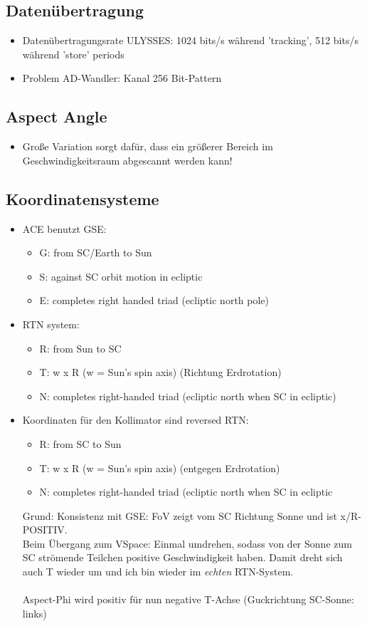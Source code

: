 \documentclass[]{article}
\begin{document}
	\subsection{Datenübertragung}
		\begin{itemize}
			\item Datenübertragungsrate ULYSSES: 1024 bits/s während 'tracking', 512 bits/s während 'store' periods
			\item Problem AD-Wandler: Kanal 256 Bit-Pattern 
		\end{itemize}
	\subsection{Aspect Angle}
	\begin{itemize}
		\item Große Variation sorgt dafür, dass ein größerer Bereich im Geschwindigkeitsraum abgescannt werden kann!
	\end{itemize}
	\subsection{Koordinatensysteme}
	\begin{itemize}
	\item ACE benutzt GSE: 
		\begin{itemize}
			\item G: from SC/Earth to Sun
			\item S: against SC orbit motion in ecliptic
			\item E: completes right handed triad (ecliptic north pole)
		\end{itemize}
	\item RTN system:
		\begin{itemize}
			\item R: from Sun to SC
			\item T: w x R (w = Sun's spin axis) (Richtung Erdrotation)
			\item N: completes right-handed triad (ecliptic north when SC in ecliptic)
		\end{itemize}
	\item Koordinaten für den Kollimator sind reversed RTN:
		\begin{itemize}
			\item R: from SC to Sun
			\item T: w x R (w = Sun's spin axis) (entgegen Erdrotation)
			\item N: completes right-handed triad (ecliptic north when SC in ecliptic
		\end{itemize}
	Grund: Konsistenz mit GSE: FoV zeigt vom SC Richtung Sonne und ist x/R-POSITIV.\\
	Beim Übergang zum VSpace: Einmal umdrehen, sodass von der Sonne zum SC strömende Teilchen positive Geschwindigkeit haben. Damit dreht sich auch T wieder um und ich bin wieder im \textit{echten} RTN-System. \\ \\
	Aspect-Phi wird positiv für nun negative T-Achse (Guckrichtung SC-Sonne: links)
	\end{itemize}
\end{document}
